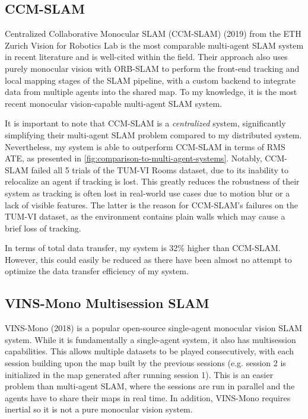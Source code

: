\subsection{CCM-SLAM}
\label{sec:ccm-slam}
Centralized Collaborative Monocular SLAM (CCM-SLAM) (2019) from the ETH Zurich Vision for Robotics Lab \autocite{schmuck2019ccm} is the most comparable multi-agent SLAM system in recent literature and is well-cited within the field. Their approach also uses purely monocular vision with ORB-SLAM to perform the front-end tracking and local mapping stages of the SLAM pipeline, with a custom backend to integrate data from multiple agents into the shared map. To my knowledge, it is the most recent monocular vision-capable multi-agent SLAM system.

It is important to note that CCM-SLAM is a \textit{centralized} system, significantly simplifying their multi-agent SLAM problem compared to my distributed system. Nevertheless, my system is able to outperform CCM-SLAM in terms of RMS ATE, as presented in \autoref{fig:comparison-to-multi-agent-systems}. Notably, CCM-SLAM failed all 5 trials of the TUM-VI Rooms dataset, due to its inability to relocalize an agent if tracking is lost. This greatly reduces the robustness of their system as tracking is often lost in real-world use cases due to motion blur or a lack of visible features. The latter is the reason for CCM-SLAM's failures on the TUM-VI dataset, as the environment contains plain walls which may cause a brief loss of tracking.

In terms of total data transfer, my system is 32\% higher than CCM-SLAM. However, this could easily be reduced as there have been almost no attempt to optimize the data transfer efficiency of my system.

\subsection{VINS-Mono Multisession SLAM}
VINS-Mono (2018) \autocite{8421746} is a popular open-source single-agent monocular vision SLAM system. While it is fundamentally a single-agent system, it also has multisession capabilities. This allows multiple datasets to be played consecutively, with each session building upon the map built by the previous sessions (e.g. session 2 is initialized in the map generated after running session 1). This is an easier problem than multi-agent SLAM, where the sessions are run in parallel and the agents have to share their maps in real time. In addition, VINS-Mono requires inertial so it is not a pure monocular vision system.

